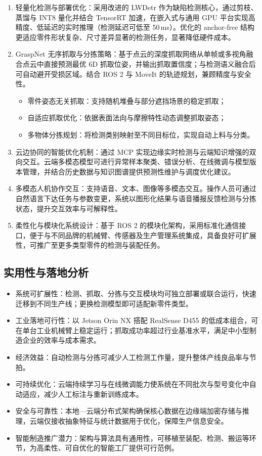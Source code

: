 \documentclass{cumcmthesis}
\begin{document}
\begin{enumerate}
    \item 轻量化检测与部署优化：采用改进的 LWDetr 作为缺陷检测核心，通过剪枝、蒸馏与 INT8 量化并结合 TensorRT 加速，在嵌入式与通用 GPU 平台实现高精度、低延迟的实时推理（检测延迟可低至 50\,ms）。优化的 anchor-free 结构更适应零件形状复杂、尺寸差异显著的检测任务，显著降低硬件成本。
    \item GraspNet 无序抓取与分拣策略：基于点云的深度抓取网络从单帧或多视角融合点云中直接预测最优 6D 抓取位姿，并输出抓取置信度；与检测语义融合后可自动避开受损区域。结合 ROS 2 \cite{quigley2009ros} 与 MoveIt\cite{sucan2012ompl} 的轨迹规划，兼顾精度与安全性。
    \begin{itemize}
        \item 零件姿态无关抓取：支持随机堆叠与部分遮挡场景的稳定抓取；
        \item 自适应抓取优化：依据表面法向与摩擦特性动态调整抓取姿态；
        \item 多物体分拣规划：将检测类别映射至不同目标位，实现自动上料与分类。
    \end{itemize}
    \item 云边协同的智能优化机制：通过 MCP 实现边缘实时检测与云端知识增强的双向交互。云端多模态模型可进行异常样本聚类、错误分析、在线微调与模型版本管理，并结合历史数据与知识图谱提供预测性维护与调度优化建议。
    \item 多模态人机协作交互：支持语音、文本、图像等多模态交互。操作人员可通过自然语言下达任务与参数变更，系统以图形化结果与语音播报反馈检测与分拣状态，提升交互效率与可解释性。
    \item 柔性化与模块化系统设计：基于 ROS 2 的模块化架构，采用标准化通信接口，便于与不同品牌的机械臂、传感器及生产管理系统集成，具备良好可扩展性，可推广至更多类型零件的检测与装配任务。
\end{enumerate}

\subsection{实用性与落地分析}

\begin{itemize}
    \item 系统可扩展性：检测、抓取、分拣与交互模块均可独立部署或联合运行，快速迁移到不同生产线；更换检测模型即可适配新零件类型。
    \item 工业落地可行性：以 Jetson Orin NX 搭配 RealSense D455 的低成本组合，可在单台工业机械臂上稳定运行；抓取成功率超过行业基准水平，满足中小型制造企业的效率与成本需求。
    \item 经济效益：自动检测与分拣可减少人工检测工作量，提升整体产线良品率与节拍。
    \item 可持续优化：云端持续学习与在线微调能力使系统在不同批次与型号变化中自动适应，减少人工标注与重新训练成本。
    \item 安全与可靠性：本地—云端分布式架构确保核心数据在边缘端加密存储与推理，云端仅接收抽象特征与统计数据用于优化，保障生产信息安全。
    \item 智能制造推广潜力：架构与算法具有通用性，可移植至装配、检测、搬运等环节，为高柔性、可自优化的智能工厂提供可行范例。
\end{itemize}
\end{document}
